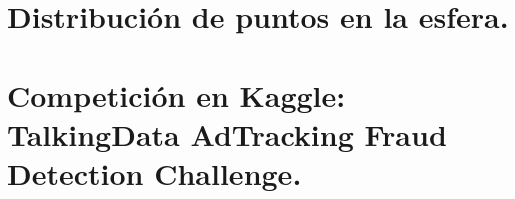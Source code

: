 \documentclass[11pt,twoside,a4paper]{book}
\numberwithin{equation}{section}
\numberwithin{figure}{section}
\theoremstyle{plain}
\theoremstyle{definition}
\theoremstyle{plain}
\theoremstyle{definition}
\theoremstyle{remark}
\theoremstyle{definition}
\theoremstyle{lem}
\theoremstyle{cor}
\begin{document}



\newpage
\phantom{o}
\newpage

\setcounter{page}{3}

\renewcommand{\contentsname}{Índice}
\tableofcontents
\newpage
\listoffigures
\begingroup
\let\clearpage\relax
\listoftables
\endgroup
\newpage
\phantom{o}
\newpage

\pagestyle{headings}

\setcounter{page}{1}


\renewcommand{\appendixname}{Apéndices}
\renewcommand{\appendixtocname}{Apéndices}
\renewcommand{\appendixpagename}{Apéndices}


\part{Distribución de puntos en la esfera.}
%
\part{Competición en Kaggle: TalkingData AdTracking Fraud Detection Challenge.}





\appendix


\end{document}
